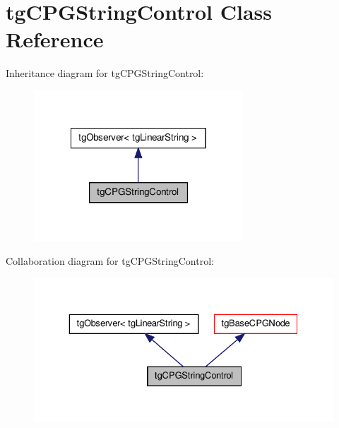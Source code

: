 \hypertarget{classtg_c_p_g_string_control}{\section{tg\-C\-P\-G\-String\-Control Class Reference}
\label{classtg_c_p_g_string_control}
}


Inheritance diagram for tg\-C\-P\-G\-String\-Control\-:\nopagebreak
\begin{figure}[H]
\begin{center}
\leavevmode
\includegraphics[width=222pt]{classtg_c_p_g_string_control__inherit__graph}
\end{center}
\end{figure}


Collaboration diagram for tg\-C\-P\-G\-String\-Control\-:\nopagebreak
\begin{figure}[H]
\begin{center}
\leavevmode
\includegraphics[width=332pt]{classtg_c_p_g_string_control__coll__graph}
\end{center}
\end{figure}
